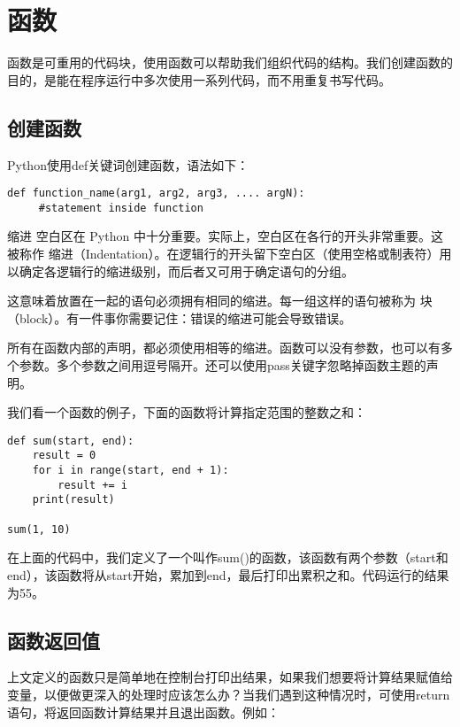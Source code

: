 \section{函数}

函数是可重用的代码块，使用函数可以帮助我们组织代码的结构。我们创建函数的目的，是能在程序运行中多次使用一系列代码，而不用重复书写代码。

\subsection{创建函数}
Python使用def关键词创建函数，语法如下：

\begin{lstlisting}
def function_name(arg1, arg2, arg3, .... argN):
     #statement inside function
\end{lstlisting}

\begin{myremark}{缩进}
空白区在 Python 中十分重要。实际上，空白区在各行的开头非常重要。这被称作 缩进（Indentation）。在逻辑行的开头留下空白区（使用空格或制表符）用以确定各逻辑行的缩进级别，而后者又可用于确定语句的分组。

这意味着放置在一起的语句必须拥有相同的缩进。每一组这样的语句被称为 块（block）。有一件事你需要记住：错误的缩进可能会导致错误。

所有在函数内部的声明，都必须使用相等的缩进。函数可以没有参数，也可以有多个参数。多个参数之间用逗号隔开。还可以使用pass关键字忽略掉函数主题的声明。
\end{myremark}

我们看一个函数的例子，下面的函数将计算指定范围的整数之和：

\begin{lstlisting}
def sum(start, end):
    result = 0
    for i in range(start, end + 1):
        result += i
    print(result)

sum(1, 10)
\end{lstlisting}

在上面的代码中，我们定义了一个叫作sum()的函数，该函数有两个参数（start和end），该函数将从start开始，累加到end，最后打印出累积之和。代码运行的结果为55。

\subsection{函数返回值}
上文定义的函数只是简单地在控制台打印出结果，如果我们想要将计算结果赋值给变量，以便做更深入的处理时应该怎么办？当我们遇到这种情况时，可使用return语句，将返回函数计算结果并且退出函数。例如：

